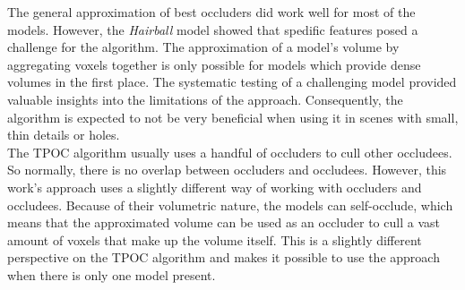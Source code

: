 \noindent
The general approximation of best occluders did work well for most of the models. However, the \emph{Hairball} model showed that spedific 
features posed a challenge for the algorithm. The approximation of a model's volume by aggregating voxels together is only possible for 
models which provide dense volumes in the first place. The systematic testing of a challenging model provided valuable insights into the 
limitations of the approach. Consequently, the algorithm is expected to not be very beneficial when using it in scenes with small, thin 
details or holes.\\





\noindent
The \ac{TPOC} algorithm usually uses a handful of occluders to cull other occludees. So normally, there is no overlap between occluders and 
occludees. However, this work's approach uses a slightly different way of working with occluders and occludees. Because of their volumetric 
nature, the models can self-occlude, which means that the approximated volume can be used as an occluder to cull a vast amount of voxels that 
make up the volume itself. This is a slightly different perspective on the \ac{TPOC} algorithm and makes it possible to use the approach when 
there is only one model present. \\

